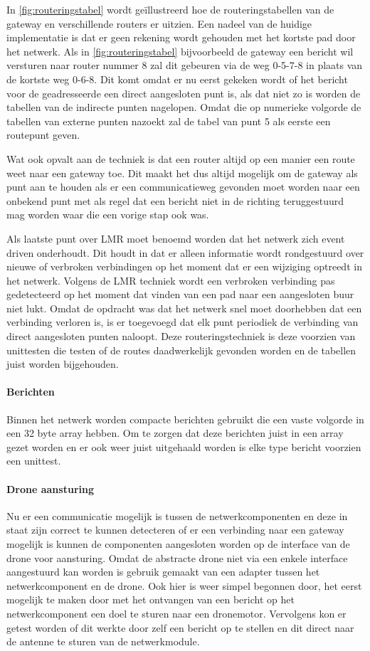 \documentclass[a4paper, 11pt, oneside]{report}
\begin{document}
In \autoref{fig:routeringstabel} wordt geïllustreerd hoe de routeringstabellen van de gateway en verschillende routers er uitzien.
Een nadeel van de huidige implementatie is dat er geen rekening wordt gehouden met het kortste pad door het netwerk.
Als in \autoref{fig:routeringstabel} bijvoorbeeld de gateway een bericht wil versturen naar router nummer 8 zal dit gebeuren via de weg 0-5-7-8 in plaats van de kortste weg 0-6-8. Dit komt omdat er nu eerst gekeken wordt of het bericht voor de geadresseerde een direct aangesloten punt is, als dat niet zo is worden de tabellen van de indirecte punten nagelopen. Omdat die op numerieke volgorde de tabellen van externe punten nazoekt zal de tabel van punt 5 als eerste een routepunt geven.

Wat ook opvalt aan de techniek is dat een router altijd op een manier een route weet naar een gateway toe. Dit maakt het dus altijd mogelijk om de gateway als punt aan te houden als er een communicatieweg gevonden moet worden naar een onbekend punt met als regel dat een bericht niet in de richting teruggestuurd mag worden waar die een vorige stap ook was.

Als laatste punt over LMR moet benoemd worden dat het netwerk zich event driven onderhoudt.
Dit houdt in dat er alleen informatie wordt rondgestuurd over nieuwe of verbroken verbindingen op het moment dat er een wijziging optreedt in het netwerk. 
Volgens de LMR techniek wordt een verbroken verbinding pas gedetecteerd op het moment dat vinden van een pad naar een aangesloten buur niet lukt.
Omdat de opdracht was dat het netwerk snel moet doorhebben dat een verbinding verloren is, is er toegevoegd dat elk punt periodiek de verbinding van direct aangesloten punten naloopt. 
Deze routeringstechniek is deze voorzien van unittesten die testen of de routes daadwerkelijk gevonden worden en de tabellen juist worden bijgehouden.

\paragraph{Berichten}
Binnen het netwerk worden compacte berichten gebruikt die een vaste volgorde in een 32 byte array hebben.
Om te zorgen dat deze berichten juist in een array gezet worden en er ook weer juist uitgehaald worden is elke type bericht voorzien een unittest.

\paragraph{Drone aansturing}
Nu er een communicatie mogelijk is tussen de netwerkcomponenten en deze in staat zijn correct te kunnen detecteren of er een verbinding naar een gateway mogelijk is kunnen de componenten aangesloten worden op de interface van de drone voor aansturing.
Omdat de abstracte drone niet via een enkele interface aangestuurd kan worden is gebruik gemaakt van een adapter tussen het netwerkcomponent en de drone. 
Ook hier is weer simpel begonnen door, het eerst mogelijk te maken door met het ontvangen van een bericht op het netwerkcomponent een doel te sturen naar een dronemotor. Vervolgens kon er getest worden of dit werkte door zelf een bericht op te stellen en dit direct naar de antenne te sturen van de netwerkmodule.
\end{document}
